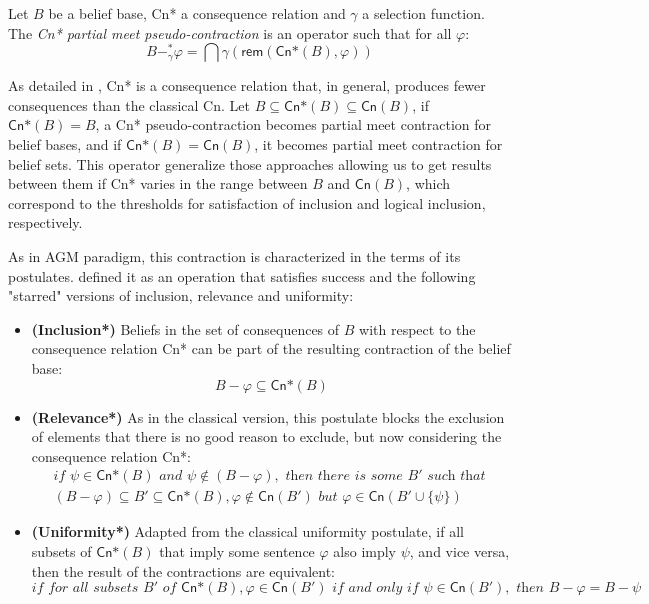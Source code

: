 \begin{definition}
    Let $B$ be a belief base, \textsf{Cn*} a consequence relation and $\gamma$ a selection function. The \textit{\textsf{Cn*} partial meet pseudo-contraction} is an operator such that for all $\varphi$:
    $$B -_{\gamma}^{*} \varphi = \bigcap \gamma(\textsf{rem}(\textsf{Cn*}(B), \varphi))$$
\end{definition}

As detailed in \citet{Santos2018}, \textsf{Cn*} is a consequence relation that, in general, produces fewer consequences than the classical \textsf{Cn}. Let $B \subseteq \textsf{Cn*}(B) \subseteq \textsf{Cn}(B)$, if $\textsf{Cn*}(B) = B$, a \textsf{Cn*} pseudo-contraction becomes partial meet contraction for belief bases, and if $\textsf{Cn*}(B) = \textsf{Cn}(B)$, it becomes partial meet contraction for belief sets. This operator generalize those approaches allowing us to get results between them if \textsf{Cn*} varies in the range between $B$ and $\textsf{Cn}(B)$, which correspond to the thresholds for satisfaction of inclusion and logical inclusion, respectively.

As in AGM paradigm, this contraction is characterized in the terms of its postulates. \citeauthor{Santos2016} defined it as an operation that satisfies success and the following "starred" versions of inclusion, relevance and uniformity:

\begin{itemize}
    \item[] \textbf{(Inclusion*)} Beliefs in the set of consequences of $B$ with respect to the consequence relation \textsf{Cn*} can be part of the resulting contraction of the belief base:
    $$B - \varphi \subseteq \textsf{Cn*}(B)$$

    \item[] \textbf{(Relevance*)} As in the classical version, this postulate blocks the exclusion of elements that there is no good reason to exclude, but now considering the consequence relation \textsf{Cn*}:
    \begin{equation*}
        \begin{split}
            \textit{if } \psi \in \textsf{Cn*}(B) \textit{ and } \psi \notin  (B - \varphi), \textit{ then there is some } B' \textit{ such that }  \\
                (B - \varphi) \subseteq B' \subseteq \textsf{Cn*}(B), \varphi \notin \textsf{Cn}(B') \textit{ but } \varphi \in \textsf{Cn}(B' \cup \{ \psi \})
        \end{split}
    \end{equation*}

    \item[] \textbf{(Uniformity*)} Adapted from the classical uniformity postulate, if all subsets of $\textsf{Cn*}(B)$ that imply some sentence $\varphi$ also imply $\psi$, and vice versa, then the result of the contractions are equivalent:
    $$\textit{if for all subsets } B' \textit{ of } \textsf{Cn*}(B), \varphi \in \textsf{Cn}(B') \textit{ if and only if } \psi \in \textsf{Cn}(B'), \textit{ then } B - \varphi = B - \psi$$
\end{itemize}

